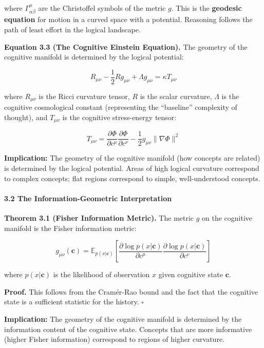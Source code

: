 \documentclass[
  11pt,
  a4paper,
]{article}
\begin{document}
where \(\Gamma^\mu_{\alpha\beta}\) are the Christoffel symbols of the
metric \(g\). This is the \textbf{geodesic equation} for motion in a
curved space with a potential. Reasoning follows the path of least
effort in the logical landscape.

\textbf{Equation 3.3 (The Cognitive Einstein Equation).} The geometry of
the cognitive manifold is determined by the logical potential:

\[R_{\mu\nu} - \frac{1}{2} R g_{\mu\nu} + \Lambda g_{\mu\nu} = \kappa T_{\mu\nu}\]

where \(R_{\mu\nu}\) is the Ricci curvature tensor, \(R\) is the scalar
curvature, \(\Lambda\) is the cognitive cosmological constant
(representing the ``baseline'' complexity of thought), and
\(T_{\mu\nu}\) is the cognitive stress-energy tensor:

\[T_{\mu\nu} = \frac{\partial \Phi}{\partial c^\mu} \frac{\partial \Phi}{\partial c^\nu} - \frac{1}{2} g_{\mu\nu} \| \nabla \Phi \|^2\]

\textbf{Implication:} The geometry of the cognitive manifold (how
concepts are related) is determined by the logical potential. Areas of
high logical curvature correspond to complex concepts; flat regions
correspond to simple, well-understood concepts.

\paragraph{3.2 The Information-Geometric
Interpretation}\label{the-information-geometric-interpretation}

\textbf{Theorem 3.1 (Fisher Information Metric).} The metric \(g\) on
the cognitive manifold is the Fisher information metric:

\[g_{\mu\nu}(\mathbf{c}) = \mathbb{E}_{p(x|\mathbf{c})} \left[ \frac{\partial \log p(x|\mathbf{c})}{\partial c^\mu} \frac{\partial \log p(x|\mathbf{c})}{\partial c^\nu} \right]\]

where \(p(x|\mathbf{c})\) is the likelihood of observation \(x\) given
cognitive state \(\mathbf{c}\).

\textbf{Proof.} This follows from the Cramér-Rao bound and the fact that
the cognitive state is a sufficient statistic for the history.
\(\square\)

\textbf{Implication:} The geometry of the cognitive manifold is
determined by the information content of the cognitive state. Concepts
that are more informative (higher Fisher information) correspond to
regions of higher curvature.
\end{document}
